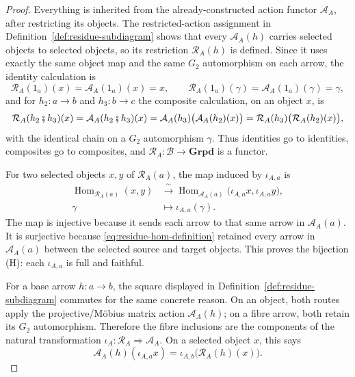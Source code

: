 \documentclass[11pt]{article}
\theoremstyle{plain}
\theoremstyle{definition}
\theoremstyle{remark}
\begin{document}
\begin{proof}
Everything is inherited from the already-constructed action functor
$\mathcal A_A$, after restricting its objects. The restricted-action
assignment in Definition~\ref{def:residue-subdiagram} shows that every
$\mathcal A_A(h)$ carries selected objects to selected objects, so its
restriction $\mathcal R_A(h)$ is defined.  Since it uses exactly the same
object map and the same $G_2$ automorphism on each arrow, the identity calculation is
\[
 \mathcal R_A(1_a)(x)=\mathcal A_A(1_a)(x)=x,\qquad
 \mathcal R_A(1_a)(\gamma)=\mathcal A_A(1_a)(\gamma)=\gamma,
\]
and for $h_2:a\to b$ and $h_3:b\to c$ the composite calculation, on an
object $x$, is
\[
 \mathcal R_A(h_2\fatsemi h_3)(x)
  =\mathcal A_A(h_2\fatsemi h_3)(x)
  =\mathcal A_A(h_3)\bigl(\mathcal A_A(h_2)(x)\bigr)
  =\mathcal R_A(h_3)\bigl(\mathcal R_A(h_2)(x)\bigr),
\]
with the identical chain on a $G_2$ automorphism $\gamma$.  Thus identities go to
identities, composites go to composites, and
$\mathcal R_A:\mathcal B\to\mathbf{Grpd}$ is a functor.

For two selected objects $x,y$ of $\mathcal R_A(a)$, the map induced by
$\iota_{A,a}$ is
\[
\begin{aligned}
 \operatorname{Hom}_{\mathcal R_A(a)}(x,y)
 &\xrightarrow{\ \sim\ }
 \operatorname{Hom}_{\mathcal A_A(a)}
   \bigl(\iota_{A,a}x,\iota_{A,a}y\bigr),\\
 \gamma&\longmapsto\iota_{A,a}(\gamma).
\end{aligned}
                                                        \tag{H}\label{eq:residue-fibre-hom}
\]
The map is injective because it sends each arrow to that same arrow in
$\mathcal A_A(a)$.  It is surjective because
\eqref{eq:residue-hom-definition} retained every arrow in $\mathcal A_A(a)$
between the selected source and target objects.  This proves the
bijection \textup{(H)}: each $\iota_{A,a}$ is full and faithful.

For a base arrow $h:a\to b$, the square displayed in
Definition~\ref{def:residue-subdiagram} commutes for the same concrete
reason.  On an object, both routes apply the projective/M\"obius matrix
action $\mathcal A_A(h)$; on a fibre arrow, both retain its $G_2$ automorphism.
Therefore the fibre inclusions are the components of the natural
transformation $\iota_A:\mathcal R_A\Rightarrow\mathcal A_A$.  On a
selected object $x$, this says
\[
  \mathcal A_A(h)(\iota_{A,a}x)
   =\iota_{A,b}\bigl(\mathcal R_A(h)(x)\bigr).
                                                        \tag{Src}
\]


\end{proof}
\end{document}
